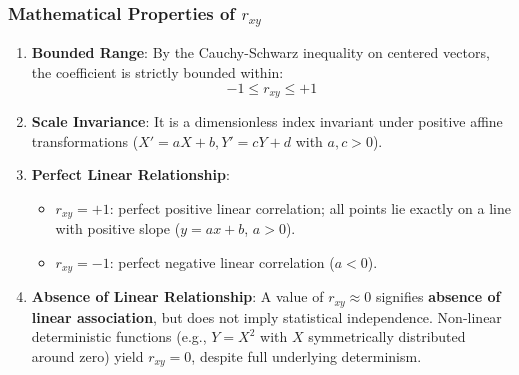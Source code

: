 \subsubsection{Mathematical Properties of $r_{xy}$}
\begin{enumerate}
    \item \textbf{Bounded Range}: By the Cauchy-Schwarz inequality on centered vectors, the coefficient is strictly bounded within:
    \begin{equation}
        -1 \le r_{xy} \le +1
    \end{equation}
    \item \textbf{Scale Invariance}: It is a dimensionless index invariant under positive affine transformations ($X' = aX + b, Y' = cY + d$ with $a, c > 0$).
    \item \textbf{Perfect Linear Relationship}:
    \begin{itemize}
        \item $r_{xy} = +1$: perfect positive linear correlation; all points lie exactly on a line with positive slope ($y = ax + b$, $a > 0$).
        \item $r_{xy} = -1$: perfect negative linear correlation ($a < 0$).
    \end{itemize}
    \item \textbf{Absence of Linear Relationship}: A value of $r_{xy} \approx 0$ signifies \textbf{absence of linear association}, but does not imply statistical independence. Non-linear deterministic functions (e.g., $Y = X^2$ with $X$ symmetrically distributed around zero) yield $r_{xy} = 0$, despite full underlying determinism.
\end{enumerate}

